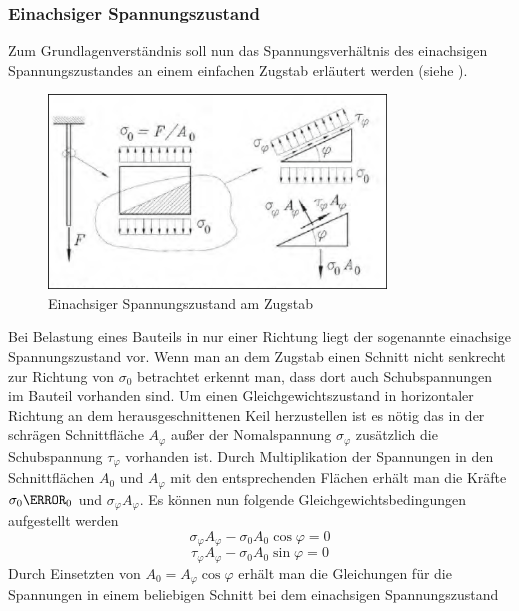 \documentclass[12pt,a4paper,parskip]{scrartcl}
\begin{document}
{\subsubsection{Einachsiger Spannungszustand}
Zum Grundlagenverständnis soll nun das Spannungsverhältnis des einachsigen Spannungszustandes an einem einfachen Zugstab erläutert werden (siehe ).
\begin{figure}
\centering
\includegraphics[width=0.8\textwidth]{einachsspann}
\caption[Einachsiger Spannungszustand ]{Einachsiger Spannungszustand am Zugstab\protect\footnotemark}
\label{fig:einachsspann} 
\end{figure}
Bei Belastung eines Bauteils in nur einer Richtung liegt der sogenannte einachsige Spannungszustand vor. Wenn man an dem Zugstab  einen Schnitt nicht senkrecht zur Richtung von $ \sigma_0 $ betrachtet erkennt man, dass dort auch Schubspannungen im Bauteil vorhanden sind. Um einen Gleichgewichtszustand in horizontaler Richtung an dem herausgeschnittenen Keil herzustellen ist es nötig das in der schrägen Schnittfläche $ A_{\varphi} $ außer der Nomalspannung $ \sigma_{\varphi} $ zusätzlich die Schubspannung $ \tau_{\varphi} $ vorhanden ist. Durch Multiplikation der Spannungen in den Schnittflächen $ A_0 $ und $ A_{\varphi} $ mit den entsprechenden Flächen erhält man die Kräfte $ \sigma_0 \A_0 $ und $ \sigma_{\varphi} A_{\varphi} $. Es können nun folgende Gleichgewichtsbedingungen aufgestellt werden \begin{equation}
\sigma_{\varphi}A_{\varphi} - \sigma_0 A_0\cos{\varphi} = 0  
\end{equation}
\begin{equation}
\tau_{\varphi}A_{\varphi} - \sigma_0A_0\sin{\varphi} = 0
\end{equation} Durch Einsetzten von $ A_0 = A_{\varphi}\cos{\varphi}$ erhält man die Gleichungen für die Spannungen in einem beliebigen Schnitt bei dem einachsigen Spannungszustand
}
\end{document}
